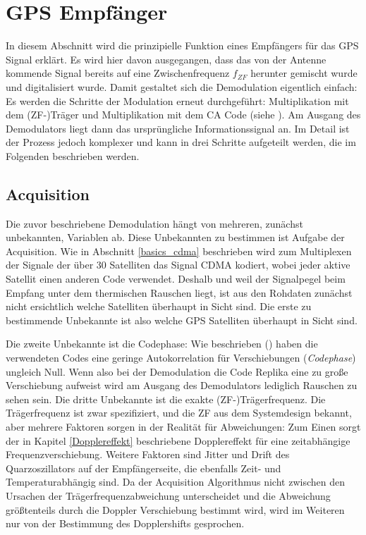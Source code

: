 \section{GPS Empfänger}
In diesem Abschnitt wird die prinzipielle Funktion eines Empfängers für das GPS Signal erklärt. Es wird hier davon ausgegangen, dass das von der Antenne kommende Signal bereits auf eine Zwischenfrequenz $f_{ZF}$ herunter gemischt wurde und digitalisiert wurde. Damit gestaltet sich die Demodulation eigentlich einfach: Es werden die Schritte der Modulation erneut durchgeführt: Multiplikation mit dem (ZF-)Träger und Multiplikation mit dem CA Code (siehe ). Am Ausgang des Demodulators liegt dann das ursprüngliche Informationssignal an. Im Detail ist der Prozess jedoch komplexer und kann in drei Schritte aufgeteilt werden, die im Folgenden beschrieben werden.

\subsection{Acquisition}
\label{Grundlagen_Acquisition}

Die zuvor beschriebene Demodulation hängt von mehreren, zunächst unbekannten, Variablen ab. Diese Unbekannten zu bestimmen ist Aufgabe der Acquisition.
Wie in Abschnitt \ref{basics_cdma} beschrieben wird zum Multiplexen der Signale der über 30 Satelliten das Signal CDMA kodiert, wobei jeder aktive Satellit einen anderen Code verwendet. Deshalb und weil der Signalpegel beim Empfang unter dem thermischen Rauschen liegt, ist aus den Rohdaten zunächst nicht ersichtlich welche Satelliten überhaupt in Sicht sind. Die erste zu bestimmende Unbekannte ist also welche GPS Satelliten überhaupt in Sicht sind.

Die zweite Unbekannte ist die \gls{Codephase}: Wie beschrieben () haben die verwendeten Codes eine geringe Autokorrelation für Verschiebungen (\emph{Codephase}) ungleich Null. Wenn also bei der Demodulation die Code Replika eine zu große Verschiebung aufweist wird am Ausgang des Demodulators lediglich Rauschen zu sehen sein.
Die dritte Unbekannte ist die exakte (ZF-)Trägerfrequenz. Die Trägerfrequenz ist zwar spezifiziert, und die ZF aus dem Systemdesign bekannt, aber mehrere Faktoren sorgen in der Realität für Abweichungen: Zum Einen sorgt der in Kapitel \ref{Dopplereffekt} beschriebene Dopplereffekt für eine zeitabhängige Frequenzverschiebung. Weitere Faktoren sind Jitter und Drift des Quarzoszillators auf der Empfängerseite, die ebenfalls Zeit- und Temperaturabhängig sind. Da der Acquisition Algorithmus nicht zwischen den Ursachen der Trägerfrequenzabweichung unterscheidet und die Abweichung größtenteils durch die Doppler Verschiebung bestimmt wird, wird im Weiteren nur von der Bestimmung des Dopplershifts gesprochen. 

